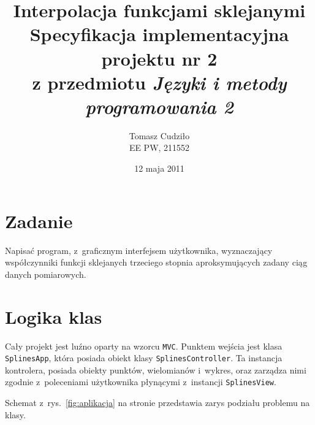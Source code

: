 \documentclass[10pt,a4paper]{article}
\newcommand{\f}[1]{\texttt{#1}}
\begin{document}
\title{ 
  Interpolacja funkcjami sklejanymi\\
  {\normalsize Specyfikacja implementacyjna projektu nr 2}\\\vspace{-12pt}
  {\normalsize z przedmiotu \emph{Języki i metody programowania 2}}
}
\author{
  Tomasz Cudziło\\
  {\small EE PW, 211552}
}
\date{12 maja 2011}
\maketitle

\section*{Zadanie}
\label{sec:zadanie}

Napisać program, z~graficznym interfejsem użytkownika, wyznaczający
współczynniki funkcji sklejanych trzeciego stopnia aproksymujących zadany ciąg
danych pomiarowych.

\vspace{20pt}

\section{Logika klas}

Cały projekt jest luźno oparty na wzorcu \f{MVC}. Punktem wejścia jest klasa
\f{SplinesApp}, która posiada obiekt klasy \f{SplinesController}. Ta
instancja kontrolera, posiada obiekty punktów, wielomianów i~wykres, oraz
zarządza nimi zgodnie z~poleceniami użytkownika płynącymi z~instancji
\f{SplinesView}.

Schemat z~rys.~\ref{fig:aplikacja} na stronie \pageref{fig:aplikacja}
przedstawia zarys podziału problemu na klasy.
\end{document}
